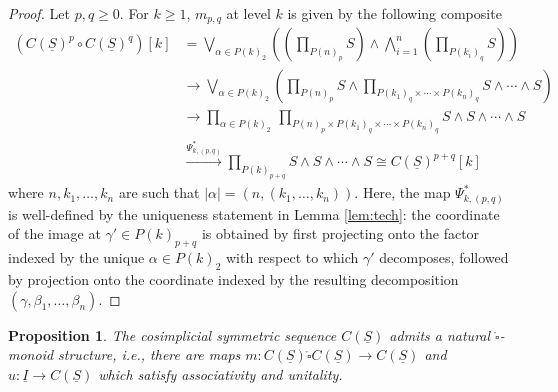 \documentclass[12pt]{amsart}
\newtheorem{proposition}[subsection]{Proposition}
\theoremstyle{definition}
\theoremstyle{remark}
\newcommand{\boxcirc}{\mathring{\square}}
\newcommand{\uS}{\underline{S}}
\begin{document}
\begin{proof}
    Let $p,q\geq 0$. For $k\geq 1$, $m_{p,q}$ at level $k$ is given by the following composite
     \begin{align*}
        ( C(\uS)^p \circ C(\uS)^q)[k] & 
        = \bigvee_{\alpha\in P(k)_2} \left( \left( \prod_{P(n)_p} S\right) \wedge \bigwedge_{i=1}^{n} \left(\prod_{P(k_i)_q} S\right) \right)\\ 
        & \to \bigvee_{\alpha \in P(k)_2} \left( \prod_{P(n)_p} S  \wedge \prod_{P(k_1)_q \times \cdots \times P(k_n)_q}  S\wedge\cdots \wedge S \right)\\
        & \to \prod_{\alpha\in P(k)_2}\, \prod_{P(n)_p \times P(k_1)_q \times \cdots \times P(k_n)_q} S\wedge S\wedge \cdots \wedge S\\
        & \xrightarrow{\Psi_{k,(p,q)}^*} \prod_{P(k)_{p+q}} S\wedge S \wedge \cdots \wedge S\cong C(\uS)^{p+q}[k]
    \end{align*}
    where $n,k_1,\dots,k_n$ are such that $ |\alpha|=(n,(k_1,\dots,k_n))$. Here, the map $\Psi_{k,(p,q)}^*$ is well-defined by the uniqueness statement in Lemma \ref{lem:tech}: the coordinate of the image at $\gamma'\in P(k)_{p+q}$ is obtained by first projecting onto the factor indexed by the unique $\alpha\in P(k)_2$ with respect to which $\gamma'$ decomposes, followed by projection onto the coordinate indexed by the resulting decomposition $(\gamma,\beta_1,\dots,\beta_n)$. 
\end{proof}

\begin{proposition}
    \label{prop:box-monoid}
    The cosimplicial symmetric sequence $C(\uS)$ admits a natural $\boxcirc$-monoid structure, i.e., there are maps $m\colon C(\uS)\boxcirc C(\uS)\to C(\uS)$ and $u \colon \underline{I}\to C(\uS)$ which satisfy associativity and unitality. 
\end{proposition}
\end{document}
